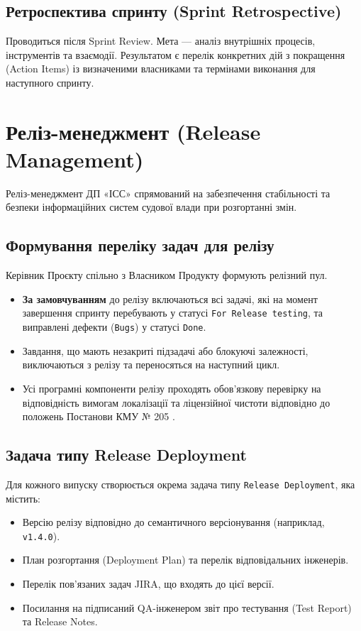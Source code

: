 \documentclass{article}
\begin{document}
\subsection{Ретроспектива спринту (Sprint Retrospective)}
Проводиться після Sprint Review. Мета --- аналіз внутрішніх процесів, інструментів та взаємодії. Результатом є перелік конкретних дій з покращення (Action Items) із визначеними власниками та термінами виконання для наступного спринту.

\section{Реліз-менеджмент (Release Management)}

Реліз-менеджмент ДП «ІСС» спрямований на забезпечення стабільності та безпеки інформаційних систем судової влади при розгортанні змін.

\subsection{Формування переліку задач для релізу}
Керівник Проєкту спільно з Власником Продукту формують релізний пул. 
\begin{itemize}
    \item \textbf{За замовчуванням} до релізу включаються всі задачі, які на момент завершення спринту перебувають у статусі \texttt{For Release testing}, та виправлені дефекти (\texttt{Bugs}) у статусі \texttt{Done}.
    \item Завдання, що мають незакриті підзадачі або блокуючі залежності, виключаються з релізу та переносяться на наступний цикл.
    \item Усі програмні компоненти релізу проходять обов'язкову перевірку на відповідність вимогам локалізації та ліцензійної чистоти відповідно до положень Постанови КМУ № 205 \cite{kmu205}.
\end{itemize}

\subsection{Задача типу Release Deployment}
Для кожного випуску створюється окрема задача типу \texttt{Release Deployment}, яка містить:
\begin{itemize}
    \item Версію релізу відповідно до семантичного версіонування (наприклад, \texttt{v1.4.0}).
    \item План розгортання (Deployment Plan) та перелік відповідальних інженерів.
    \item Перелік пов'язаних задач JIRA, що входять до цієї версії.
    \item Посилання на підписаний QA-інженером звіт про тестування (Test Report) та Release Notes.
\end{itemize}
\end{document}
